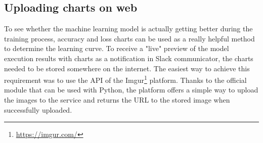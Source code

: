 \subsection{Uploading charts on web}\label{subsec:charts-web-uploading}
To see whether the machine learning model is actually getting better during the training process, accuracy and loss charts can be used as a really helpful method to determine the learning curve.
To receive a "live" preview of the model execution results with charts as a notification in Slack communicator, the charts needed to be stored somewhere on the internet.
The easiest way to achieve this requirement was to use the API of the Imgur\footnote{\url{https://imgur.com/}} platform.
Thanks to the official module that can be used with Python, the platform offers a simple way to upload the images to the service and returns the URL to the stored image when successfully uploaded.
